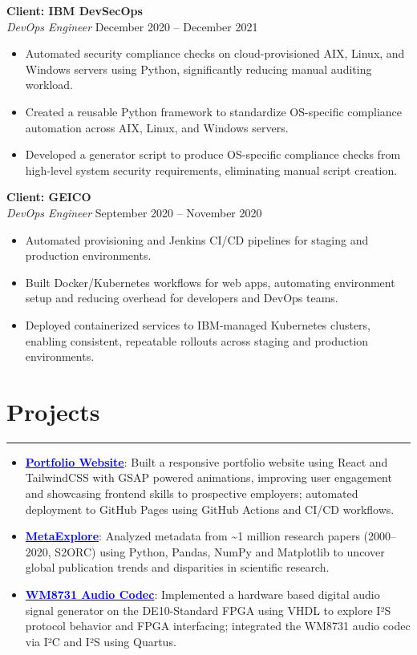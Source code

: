 \documentclass[a4paper]{article}
\newcommand{\tightsection}[1]{
  \vspace{-0.9em}
  \section*{#1}
  \vspace{-0.95em}
  {\color{gray}\hrule height 0.5pt}
  \vspace{0.5em}
}
\begin{document}
\vspace{0.5em}
\noindent
\textbf{Client: IBM DevSecOps} \\
\textit{DevOps Engineer} \hfill December 2020 -- December 2021  
\begin{itemize}[itemsep=1pt, topsep=1pt, parsep=0pt, partopsep=0pt]
    \item Automated security compliance checks on cloud-provisioned AIX, Linux, and Windows servers using Python, significantly reducing manual auditing workload.
    \item Created a reusable Python framework to standardize OS-specific compliance automation across AIX, Linux, and Windows servers.
    \item Developed a generator script to produce OS-specific compliance checks from high-level system security requirements, eliminating manual script creation.
\end{itemize}

\vspace{0.5em}
\noindent
\textbf{Client: GEICO} \\
\textit{DevOps Engineer} \hfill September 2020 -- November 2020
\begin{itemize}[itemsep=1pt, topsep=1pt, parsep=0pt, partopsep=0pt]
    \item Automated provisioning and Jenkins CI/CD pipelines for staging and production environments.
    \item Built Docker/Kubernetes workflows for web apps, automating environment setup and reducing overhead for developers and DevOps teams.
    \item Deployed containerized services to IBM-managed Kubernetes clusters, enabling consistent, repeatable rollouts across staging and production environments.
\end{itemize}

\tightsection{Projects}
\begin{itemize}[noitemsep,topsep=1pt]
    \item \href{https://AbeyHurtis.github.io}{\textcolor{blue}{\textbf{Portfolio Website}}}: Built a responsive portfolio website using React and TailwindCSS with GSAP powered animations, improving user engagement and showcasing frontend skills to prospective employers; automated deployment to GitHub Pages using GitHub Actions and CI/CD workflows.


    
    \item \href{https://github.com/AbeyHurtis/METAEXPLORE}{\textcolor{blue}{\textbf{MetaExplore}}}: Analyzed metadata from \textasciitilde1 million research papers (2000–2020, S2ORC) using Python, Pandas, NumPy and Matplotlib to uncover global publication trends and disparities in scientific research.

    \item \href{https://github.com/AbeyHurtis/FPGA-SoundGen-}{\textcolor{blue}{\textbf{WM8731 Audio Codec}}}: Implemented a hardware based digital audio signal generator on the DE10-Standard FPGA using VHDL to explore I²S protocol behavior and FPGA interfacing; integrated the WM8731 audio codec via I²C and I²S using Quartus.
\end{itemize}
\end{document}
